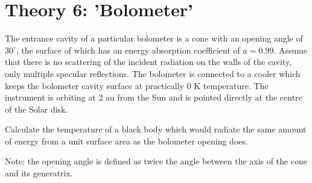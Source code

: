 \documentclass[10pt]{article}
\begin{document}
\section*{Theory 6: 'Bolometer'}
The entrance cavity of a particular bolometer is a cone with an opening angle of $30^{\circ}$, the surface of which has an energy absorption coefficient of $a=0.99$. Assume that there is no scattering of the incident radiation on the walls of the cavity, only multiple specular reflections. The bolometer is connected to a cooler which keeps the bolometer cavity surface at practically 0 K temperature. The instrument is orbiting at 2 au from the Sun and is pointed directly at the centre of the Solar disk.

Calculate the temperature of a black body which would radiate the same amount of energy from a unit surface area as the bolometer opening does.

Note: the opening angle is defined as twice the angle between the axis of the cone and its generatrix.\\
\end{document}
